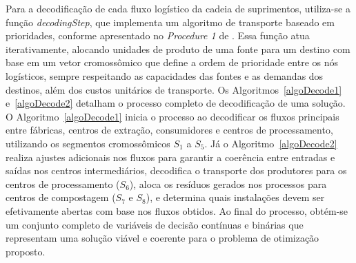 \documentclass[conference]{IEEEtran}
\begin{document}
Para a decodificação de cada fluxo logístico da cadeia de suprimentos, utiliza-se a função \textit{decodingStep}, que implementa um algoritmo de transporte baseado em prioridades, conforme apresentado 
no \textit{Procedure 1} de \cite{b12}. Essa função atua iterativamente, alocando unidades de produto de uma fonte para um destino com base em um vetor cromossômico que define a ordem de prioridade entre 
os nós logísticos, sempre respeitando as capacidades das fontes e as demandas dos destinos, além dos custos unitários de transporte. Os Algoritmos~\ref{algoDecode1} e~\ref{algoDecode2} detalham o processo 
completo de decodificação de uma solução. O Algoritmo~\ref{algoDecode1} inicia o processo ao decodificar os fluxos principais entre fábricas, centros de extração, consumidores e centros de processamento, 
utilizando os segmentos cromossômicos $S_1$ a $S_5$. Já o Algoritmo~\ref{algoDecode2} realiza ajustes adicionais nos fluxos para garantir a coerência entre entradas e saídas nos centros intermediários, 
decodifica o transporte dos produtores para os centros de processamento ($S_6$), aloca os resíduos gerados nos processos para centros de compostagem ($S_7$ e $S_8$), e determina quais instalações devem 
ser efetivamente abertas com base nos fluxos obtidos. Ao final do processo, obtém-se um conjunto completo de variáveis de decisão contínuas e binárias que representam uma solução viável e coerente para 
o problema de otimização proposto.
\end{document}
